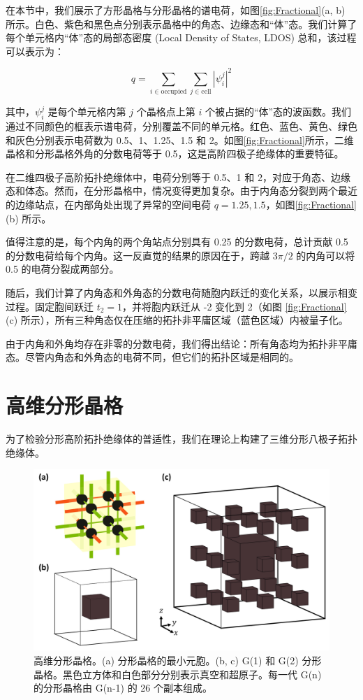 在本节中，我们展示了方形晶格与分形晶格的谱电荷，如图\ref{fig:Fractional}(a, b) 所示。白色、紫色和黑色点分别表示晶格中的角态、边缘态和“体”态。我们计算了每个单元格内“体”态的局部态密度 (Local Density of States, LDOS) 总和，该过程可以表示为：

\begin{equation}
q = \sum_{i \in \text{occupied}} \sum_{j \in \text{cell}} |\psi_i^j|^2
\end{equation}

其中，\( \psi_i^j \) 是每个单元格内第 \( j \) 个晶格点上第 \( i \) 个被占据的“体”态的波函数。我们通过不同颜色的框表示谱电荷，分别覆盖不同的单元格。红色、蓝色、黄色、绿色和灰色分别表示电荷数为 0.5、1、1.25、1.5 和 2。如图\ref{fig:Fractional}所示，二维晶格和分形晶格外角的分数电荷等于 0.5，这是高阶四极子绝缘体的重要特征。

在二维四极子高阶拓扑绝缘体中，电荷分别等于 0.5、1 和 2，对应于角态、边缘态和体态。然而，在分形晶格中，情况变得更加复杂。由于内角态分裂到两个最近的边缘站点，在内部角处出现了异常的空间电荷 \( q = 1.25, 1.5 \)，如图\ref{fig:Fractional}(b) 所示。

值得注意的是，每个内角的两个角站点分别具有 0.25 的分数电荷，总计贡献 0.5 的分数电荷给每个内角。这一反直觉的结果的原因在于，跨越 \( 3\pi/2 \) 的内角可以将 0.5 的电荷分裂成两部分。

随后，我们计算了内角态和外角态的分数电荷随胞内跃迁的变化关系，以展示相变过程。固定胞间跃迁 \( t_2 = 1 \)，并将胞内跃迁从 -2 变化到 2（如图 \ref{fig:Fractional}(c) 所示），所有三种角态仅在压缩的拓扑非平庸区域（蓝色区域）内被量子化。

由于内角和外角均存在非零的分数电荷，我们得出结论：所有角态均为拓扑非平庸态。尽管内角态和外角态的电荷不同，但它们的拓扑区域是相同的。

\section{高维分形晶格}
为了检验分形高阶拓扑绝缘体的普适性，我们在理论上构建了三维分形八极子拓扑绝缘体。

\begin{figure}[htbp]
    \centering
    \includegraphics[width=0.5\linewidth]{figure/HOTITheo/3DLattice.png}
    \caption{高维分形晶格。(a) 分形晶格的最小元胞。(b, c) G(1) 和 G(2) 分形晶格。黑色立方体和白色部分分别表示真空和超原子。每一代 G(n) 的分形晶格由 G(n-1) 的 26 个副本组成。}
    \label{fig:3DLattice}
\end{figure}

